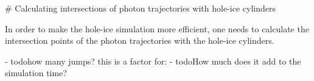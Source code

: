 
# Calculating intersections of photon trajectories with hole-ice cylinders

In order to make the hole-ice simulation more efficient, one needs to calculate the intersection points of the photon trajectories with the hole-ice cylinders.


- todo{how many jumps? this is a factor for:}
- todo{How much does it add to the simulation time?}

\lipsum

